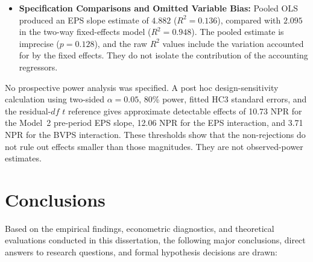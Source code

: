 \begin{itemize}
\begin{itemize}
    \end{itemize}
    \item \textbf{Specification Comparisons and Omitted Variable Bias:}
    Pooled OLS produced an EPS slope estimate of $4.882$ ($R^2=0.136$), compared with $2.095$ in the two-way fixed-effects model ($R^2=0.948$). The pooled estimate is imprecise ($p=0.128$), and the raw $R^2$ values include the variation accounted for by the fixed effects. They do not isolate the contribution of the accounting regressors.
\end{itemize}

No prospective power analysis was specified. A post hoc design-sensitivity calculation using two-sided $\alpha=0.05$, 80\% power, fitted HC3 standard errors, and the residual-$df$ $t$ reference gives approximate detectable effects of 10.73 NPR for the Model~2 pre-period EPS slope, 12.06 NPR for the EPS interaction, and 3.71 NPR for the BVPS interaction. These thresholds show that the non-rejections do not rule out effects smaller than those magnitudes. They are not observed-power estimates.

\section{Conclusions}

Based on the empirical findings, econometric diagnostics, and theoretical evaluations conducted in this dissertation, the following major conclusions, direct answers to research questions, and formal hypothesis decisions are drawn:

